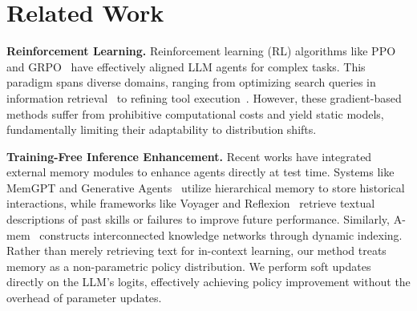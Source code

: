 \section{Related Work}
\textbf{Reinforcement Learning.} 
Reinforcement learning (RL) algorithms like PPO~\citep{ppo} and GRPO~\citep{grpo} have effectively aligned LLM agents for complex tasks. This paradigm spans diverse domains, ranging from optimizing search queries in information retrieval~\citep{search-r1, r1-searcher} to refining tool execution~\citep{torl, toolrl}. However, these gradient-based methods suffer from prohibitive computational costs and yield static models, fundamentally limiting their adaptability to distribution shifts.

\textbf{Training-Free Inference Enhancement.} 
Recent works have integrated external memory modules to enhance agents directly at test time. Systems like MemGPT and Generative Agents~\citep{memgpt, generative-agent} utilize hierarchical memory to store historical interactions, while frameworks like Voyager and Reflexion~\citep{voyager, reflexion} retrieve textual descriptions of past skills or failures to improve future performance. Similarly, A-mem~\citep{amem} constructs interconnected knowledge networks through dynamic indexing. Rather than merely retrieving text for in-context learning, our method treats memory as a non-parametric policy distribution. We perform soft updates directly on the LLM's logits, effectively achieving policy improvement without the overhead of parameter updates.


